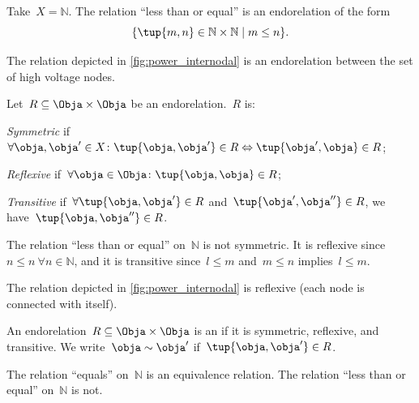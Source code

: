 \begin{example}
  Take~$X=\mathbb{N}$. The relation ``less than or equal'' is an endorelation of the form
  \begin{equation*}
      \{\tup{m,n}\in \mathbb{N}\times \mathbb{N}\mid m\leq n\}.
  \end{equation*}
\end{example}

\begin{example}
The relation depicted in \cref{fig:power_internodal} is an endorelation between the set of high voltage nodes.  
\end{example}

\begin{definition}
Let~$R\subseteq \Obja\times \Obja$ be an endorelation.~$R$ is:
\begin{compactitem}
    \item \emph{Symmetric} if~$\forall \obja, \obja'\in X\colon \tup{\obja,\obja'}\in R \Leftrightarrow \tup{\obja',\obja}\in R$;
    \item \emph{Reflexive} if~$\forall \obja\in \Obja\colon \tup{\obja,\obja}\in R$;
    \item \emph{Transitive} if~$\forall \tup{\obja,\obja'}\in R$ and~$\tup{\obja',\obja''}\in R$, we have~$\tup{\obja, \obja''}\in R$.
\end{compactitem}
\end{definition}

\begin{example}
  The relation ``less than or equal'' on~$\mathbb{N}$ is not symmetric. It is reflexive since~$n\leq n \ \forall n\in \mathbb{N}$, and it is transitive since~$l\leq m$ and~$m\leq n$ implies~$l\leq m$.
\end{example}

\begin{example}
  The relation depicted in \cref{fig:power_internodal} is reflexive (each node is connected with itself).
\end{example}

\begin{definition}
An endorelation~$R\subseteq \Obja\times \Obja$ is an \emph{} if it is symmetric, reflexive, and transitive. We write~$\obja\sim \obja'$ if~$\tup{\obja,\obja'}\in R$.
\end{definition}

\begin{example}
  The relation ``equals'' on~$\mathbb{N}$ is an equivalence relation. The relation ``less than or equal'' on~$\mathbb{N}$ is not.
\end{example}


